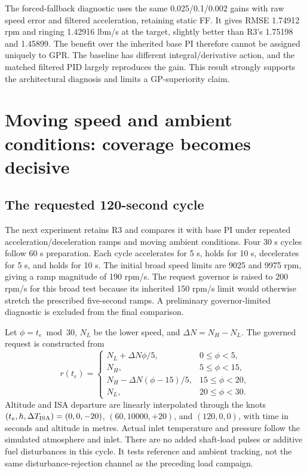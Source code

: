 The forced-fallback diagnostic uses the same 0.025/0.1/0.002 gains with raw speed error and filtered acceleration, retaining static FF. It gives RMSE 1.74912 rpm and ringing 1.42916 lbm/s at the target, slightly better than R3's 1.75198 and 1.45899. The benefit over the inherited base PI therefore cannot be assigned uniquely to GPR. The baseline has different integral/derivative action, and the matched filtered PID largely reproduces the gain. This result strongly supports the architectural diagnosis and limits a GP-superiority claim.



\chapter{Moving speed and ambient conditions: coverage becomes decisive}
\section{The requested 120-second cycle}
The next experiment retains R3 and compares it with base PI under repeated acceleration/deceleration ramps and moving ambient conditions. Four 30 s cycles follow 60 s preparation. Each cycle accelerates for 5 s, holds for 10 s, decelerates for 5 s, and holds for 10 s. The initial broad speed limits are 9025 and 9975 rpm, giving a ramp magnitude of 190 rpm/s. The request governor is raised to 200 rpm/s for this broad test because its inherited 150 rpm/s limit would otherwise stretch the prescribed five-second ramps. A preliminary governor-limited diagnostic is excluded from the final comparison.

Let $\phi=t_e\bmod30$, $N_L$ be the lower speed, and $\Delta N=N_H-N_L$. The governed request is constructed from
\begin{equation}
r(t_e)=\begin{cases}
N_L+\Delta N\phi/5,&0\leq\phi<5,\\
N_H,&5\leq\phi<15,\\
N_H-\Delta N(\phi-15)/5,&15\leq\phi<20,\\
N_L,&20\leq\phi<30.
\end{cases}
\end{equation}
Altitude and ISA departure are linearly interpolated through the knots $(t_e,h,\Delta T_{\rm ISA})=(0,0,-20)$, $(60,10000,+20)$, and $(120,0,0)$, with time in seconds and altitude in metres. Actual inlet temperature and pressure follow the simulated atmosphere and inlet. There are no added shaft-load pulses or additive fuel disturbances in this cycle. It tests reference and ambient tracking, not the same disturbance-rejection channel as the preceding load campaign.


